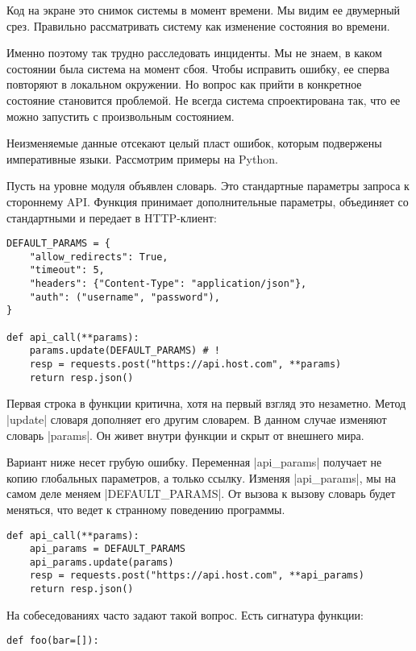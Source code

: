 Код на экране это снимок системы в момент времени. Мы видим ее двумерный
срез. Правильно рассматривать систему как изменение состояния во времени.

Именно поэтому так трудно расследовать инциденты. Мы не знаем, в каком состоянии
была система на момент сбоя. Чтобы исправить ошибку, ее сперва повторяют в
локальном окружении. Но вопрос как прийти в конкретное состояние становится
проблемой. Не всегда система спроектирована так, что ее можно запустить с
произвольным состоянием.

Неизменяемые данные отсекают целый пласт ошибок, которым подвержены императивные
языки. Рассмотрим примеры на Python.

Пусть на уровне модуля объявлен словарь. Это стандартные параметры запроса к
стороннему API. Функция принимает дополнительные параметры, объединяет со
стандартными и передает в HTTP-клиент:

\begin{verbatim}
DEFAULT_PARAMS = {
    "allow_redirects": True,
    "timeout": 5,
    "headers": {"Content-Type": "application/json"},
    "auth": ("username", "password"),
}

def api_call(**params):
    params.update(DEFAULT_PARAMS) # !
    resp = requests.post("https://api.host.com", **params)
    return resp.json()
\end{verbatim}

Первая строка в функции критична, хотя на первый взгляд это незаметно. Метод
\spverb|update| словаря дополняет его другим словарем. В данном случае изменяют словарь
\spverb|params|. Он живет внутри функции и скрыт от внешнего мира.

Вариант ниже несет грубую ошибку. Переменная \spverb|api_params| получает не копию
глобальных параметров, а только ссылку. Изменяя \spverb|api_params|, мы на самом деле
меняем \spverb|DEFAULT_PARAMS|. От вызова к вызову словарь будет меняться, что ведет к
странному поведению программы.

\begin{verbatim}
def api_call(**params):
    api_params = DEFAULT_PARAMS
    api_params.update(params)
    resp = requests.post("https://api.host.com", **api_params)
    return resp.json()
\end{verbatim}

На собеседованиях часто задают такой вопрос. Есть сигнатура функции:

\begin{verbatim}
def foo(bar=[]):
\end{verbatim}

